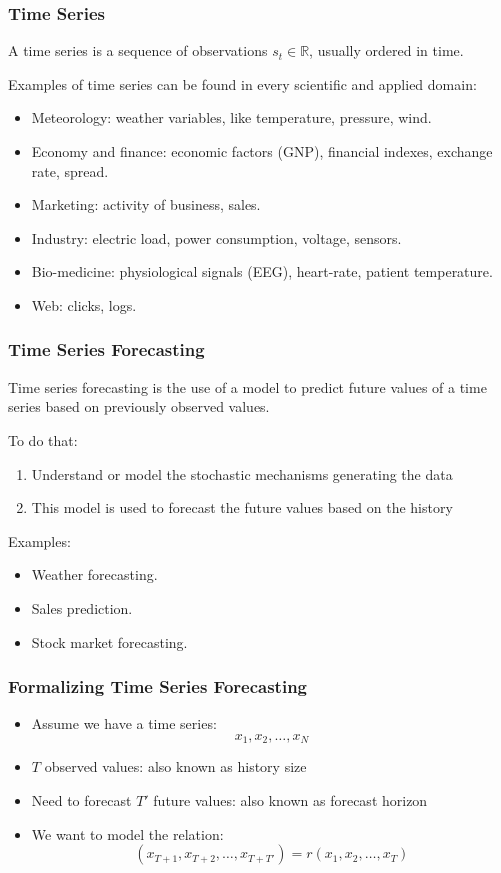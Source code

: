 \documentclass[xcolor=pdftex,dvipsnames]{beamer}
\begin{document}
\begin{frame}
  \frametitle{Time Series}
  \begin{block}{}
    A time series is a sequence of observations $s_t \in \mathbb{R}$, usually ordered in time.
  \end{block}

  Examples of time series can be found in every scientific and applied domain:
  \begin{itemize}
  \item Meteorology: weather variables, like temperature, pressure, wind.
  \item Economy and finance: economic factors (GNP), financial indexes, exchange rate, spread.
  \item Marketing: activity of business, sales.
  \item Industry: electric load, power consumption, voltage, sensors.
  \item Bio-medicine: physiological signals (EEG), heart-rate, patient temperature.
  \item Web: clicks, logs.
  \end{itemize}
\end{frame}

\begin{frame}
  \frametitle{Time Series Forecasting}
  \begin{block}{}
    Time series forecasting is the use of a model to predict future values of a time series based on previously observed values.
  \end{block}

  \pause
  To do that:
  \begin{enumerate}
  \item Understand or model the stochastic mechanisms generating the data
  \item This model is used to forecast the future values based on the history
  \end{enumerate}
  \pause
  Examples:
  \begin{itemize}
  \item Weather forecasting.
  \item Sales prediction.
  \item Stock market forecasting.
  \end{itemize}
\end{frame}

\begin{frame}
  \frametitle{Formalizing Time Series Forecasting}
  \begin{itemize}
  \item Assume we have a time series: \[ x_1, x_2, \ldots, x_N\]
    \pause
  \item $T$ observed values: also known as \alert{history size}
    \pause
  \item Need to forecast $T'$ future values: also known as \alert{forecast horizon}
    \pause
  \item We want to model the relation: \[ (x_{T+1}, x_{T+2}, \ldots, x_{T+T'}) = r(x_1, x_2, \ldots, x_T)\]
  \end{itemize}
\end{frame}
\end{document}

